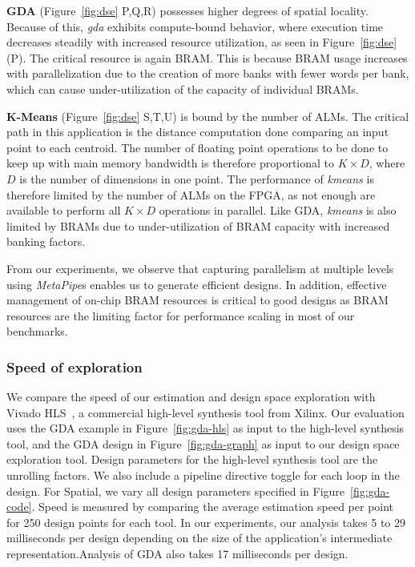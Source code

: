 \textbf{GDA} (Figure~\ref{fig:dse} P,Q,R) possesses higher degrees of spatial locality. Because of this, \emph{gda} exhibits compute-bound behavior, where execution time
decreases steadily with increased resource utilization, as seen in Figure~\ref{fig:dse}(P). The critical resource is again BRAM. This is because BRAM usage increases with parallelization due to the creation of
more banks with fewer words per bank, which can cause under-utilization of the capacity of individual BRAMs.

\textbf{K-Means} (Figure~\ref{fig:dse} S,T,U) is bound by the number of ALMs. The critical path in this application is the distance computation done comparing an input point to each centroid.
The number of floating point operations to be done to keep up with main memory bandwidth is therefore proportional to $K \times D$, where $D$ is the number of dimensions in one point.
The performance of \emph{kmeans} is therefore limited by the number of ALMs on the FPGA, as not enough are available to perform all $K \times D$ operations in parallel.
Like GDA, \emph{kmeans} is also limited by BRAMs due to under-utilization of BRAM capacity with increased banking factors.




From our experiments, we observe that capturing parallelism at multiple levels using \emph{MetaPipe}s enables us to generate
efficient designs. In addition, effective management of on-chip BRAM resources is critical to good designs
as BRAM resources are the limiting factor for performance scaling in most of our benchmarks.



\subsubsection{Speed of exploration}
We compare the speed of our estimation and design space exploration with
Vivado HLS~\cite{vivadohls}, a commercial high-level synthesis tool from Xilinx.
Our evaluation uses the GDA example in Figure~\ref{fig:gda-hls} as input to the high-level synthesis tool, and the GDA
design in Figure~\ref{fig:gda-graph} as input to our design space exploration tool. Design parameters
for the high-level synthesis tool are the unrolling factors. We also include a pipeline directive
toggle for each loop in the design. For Spatial, we vary all design parameters
specified in Figure~\ref{fig:gda-code}. Speed
is measured by comparing the average estimation speed per point for 250 design points for each tool.
In our experiments, our analysis takes 5 to 29 milliseconds per design depending on the size of the application's intermediate representation.Analysis of GDA also takes 17 milliseconds per design.

